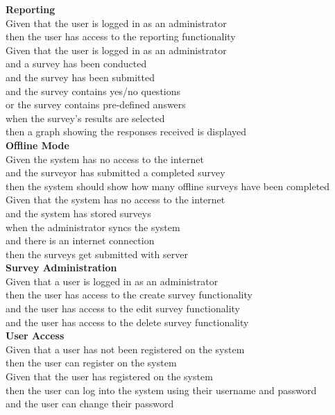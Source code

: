 \documentclass[12pt]{witseiepaper}
\begin{document}
\textbf{Reporting}\\
Given that the user is logged in as an administrator\\
then the user has access to the reporting functionality\\

Given that the user is logged in as an administrator\\
and a survey has been conducted\\
and the survey has been submitted\\
and the survey contains yes/no questions\\
or the survey contains pre-defined answers\\
when the survey’s results are selected\\
then a graph showing the responses received is displayed\\

\textbf{Offline Mode}\\
Given the system has no access to the internet \\
and the surveyor has submitted a completed survey \\
then the system should show how many offline surveys have been completed\\

Given that the system has no access to the internet\\
and the system has stored surveys \\
when the administrator syncs the system\\
and there is an internet connection \\
then the surveys get submitted with server\\

\textbf{Survey Administration}\\
Given that a user is logged in as an administrator\\
then the user has access to the create survey functionality\\
and the user has access to the edit survey functionality\\
and the user has access to the delete survey functionality\\

\textbf{User Access}\\
Given that a user has not been registered on the system\\
then the user can register on the system\\

Given that the user has registered on the system\\
then the user can log into the system using their username and password\\
and the user can change their password\\
\end{document}

